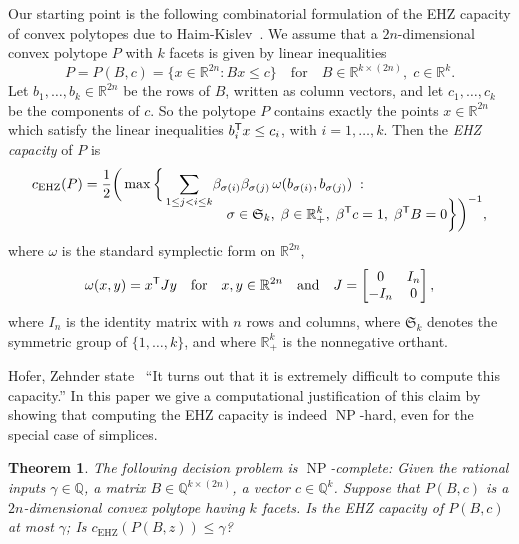 \documentclass{amsart}
\newtheorem{theorem}[defin]{Theorem}
\newcommand{\R}{\mathbb{R}}
\newcommand{\Q}{\mathbb{Q}}
\DeclareMathOperator{\NP}{NP}
\newcommand{\cEHZ}{c_{\mathrm{EHZ}}}
\newcommand{\permS}{\mathfrak{S}}
\begin{document}
Our starting point is the following combinatorial formulation of the
EHZ capacity of convex polytopes due to
Haim-Kislev~\cite{Haim-Kislev-2019}. We assume that a $2n$-dimensional
convex polytope $P$ with $k$ facets is given by linear inequalities
\[
  P = P(B,c) = \{x \in \R^{2n} : Bx \leq c\} \quad \text{for} \quad B \in
  \R^{k \times (2n)},\; c \in \R^k.
\]
Let $b_1, \ldots, b_k \in \R^{2n}$ be the rows of $B$, written as
column vectors, and let $c_1, \ldots, c_k$ be the components of $c$.
So the polytope $P$ contains exactly the points $x \in \R^{2n}$ which
satisfy the linear inequalities $b_i^{\sf T} x \leq c_i$, with
$i = 1, \ldots, k$. Then the \emph{EHZ capacity} of $P$ is
\begin{equation}
  \label{eq:cEHZ-optimization-definition}
\begin{split}
  \cEHZ(P) = \frac{1}{2} \bigg(\max\bigg\{\sum_{1 \leq j < i \leq k}
 &  \beta_{\sigma(i)} \beta_{\sigma(j)} \, \omega(b_{\sigma(i)},
 b_{\sigma(j)}) \; : \;\\[-3ex]
&  \quad \sigma \in \permS_k,\; \beta \in \R^k_+,\; 
\beta^{\sf T} c = 1, \; \beta^{\sf T} B = 0\bigg\} \bigg)^{-1},
  \end{split}
\end{equation}
where $\omega$ is the standard symplectic form on $\R^{2n}$,  
\[
   \omega(x, y) = x^{\sf T} J y \quad
   \text{for} \quad x,y \in \R^{2n} \quad \text{and} \quad 
   J = \begin{bmatrix} 0 & I_n\\ -I_n & 0 \end{bmatrix},
\]
where $I_n$ is the identity matrix with $n$ rows and columns,
where $\permS_k$ denotes the symmetric group of $\{1, \ldots, k\}$, and
where $\R^k_+$ is the nonnegative orthant.

\smallskip

Hofer, Zehnder state~\cite[p. 102]{Hofer-Zehnder-1994} ``It turns out
that it is extremely difficult to compute this capacity.'' In this
paper we give a computational justification of this claim by showing
that computing the EHZ capacity is indeed $\NP$-hard, even for
the special case of simplices.

\begin{theorem}
  \label{thm:main}
  The following decision problem is $\NP$-complete: Given the rational inputs
  $\gamma \in \Q$, a matrix $B \in \Q^{k \times (2n)}$, a vector
  $c \in \Q^k$. Suppose that $P(B,c)$ is a
  $2n$-dimensional convex polytope having $k$ facets. Is the EHZ
  capacity of $P(B,c)$ at most $\gamma$; Is
  $\cEHZ(P(B,z)) \leq \gamma$?
\end{theorem}
\end{document}
